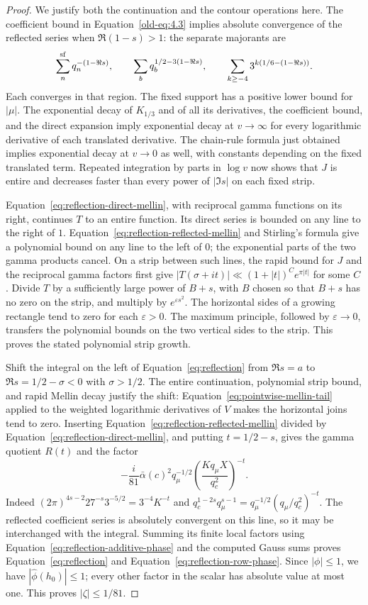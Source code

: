 \documentclass[11pt,a4paper]{article}
\numberwithin{equation}{section}
\numberwithin{figure}{section}
\theoremstyle{definition}
\theoremstyle{remark}
\begin{document}
\begin{proof}
We justify both the continuation and the contour operations here.
The coefficient bound in Equation~\eqref{old-eq:4.3} implies absolute
convergence of the reflected series when $\Re(1-s)>1$: the separate
majorants are
\[
 \sum_n^{\rm sf}q_n^{-(1-\Re s)},\qquad
 \sum_b q_b^{1/2-3(1-\Re s)},\qquad
 \sum_{k\ge-4}3^{k(1/6-(1-\Re s))}.
\]
Each converges in that region.  The fixed support has a positive lower
bound for $|\mu|$.  The exponential decay of $K_{1/3}$ and of all its
derivatives, the coefficient bound, and the direct expansion imply
exponential decay at $v\to\infty$ for every logarithmic derivative of
each translated derivative.  The chain-rule formula just obtained
implies exponential decay at $v\to0$ as well, with constants depending
on the fixed translated term.  Repeated integration by parts in
$\log v$ now shows that $J$ is entire and decreases faster than every
power of $|\Im s|$ on each fixed strip.

Equation~\eqref{eq:reflection-direct-mellin}, with reciprocal gamma
functions on its right, continues $T$ to an entire function.  Its
direct series is bounded on any line to the right of $1$.
Equation~\eqref{eq:reflection-reflected-mellin} and Stirling's formula
give a polynomial bound on any line to the left of $0$; the exponential
parts of the two gamma products cancel.  On a strip between such lines,
the rapid bound for $J$ and the reciprocal gamma factors first give
$|T(\sigma+it)|\ll (1+|t|)^C e^{\pi|t|}$ for some $C$.
Divide $T$ by a sufficiently large power of $B+s$, with $B$ chosen so
that $B+s$ has no zero on the strip, and multiply by $e^{\varepsilon s^2}$.
The horizontal sides of a growing rectangle tend to zero for each
$\varepsilon>0$.  The maximum principle, followed by
$\varepsilon\to0$, transfers the polynomial bounds on the two vertical
sides to the strip.  This proves the stated polynomial strip growth.

Shift the integral on the left of Equation~\eqref{eq:reflection} from
$\Re s=a$ to $\Re s=1/2-\sigma<0$ with $\sigma>1/2$.
The entire continuation, polynomial strip bound, and rapid Mellin decay
justify the shift: Equation~\eqref{eq:pointwise-mellin-tail} applied to the
weighted logarithmic derivatives of $V$ makes the horizontal joins tend
to zero.  Inserting
Equation~\eqref{eq:reflection-reflected-mellin} divided by
Equation~\eqref{eq:reflection-direct-mellin}, and putting $t=1/2-s$,
gives the gamma quotient $R(t)$ and the factor
\[
 -\frac i{81}\bar\alpha(c)^2q_\mu^{-1/2}
       \left(\frac{Kq_\mu X}{q_c^2}\right)^{-t}.
\]
Indeed $(2\pi)^{4s-2}27^{-s}3^{-5/2}
=3^{-4}K^{-t}$ and $q_c^{1-2s}q_\mu^{s-1}
=q_\mu^{-1/2}(q_\mu/q_c^2)^{-t}$.
The reflected coefficient series is absolutely convergent on this
line, so it may be interchanged with the integral.  Summing its finite
local factors using Equation~\eqref{eq:reflection-additive-phase}
and the computed Gauss sums proves Equation~\eqref{eq:reflection} and
Equation~\eqref{eq:reflection-row-phase}.  Since $|\phi|\le1$, we have
$|\widehat\phi(h_0)|\le1$; every other factor in the scalar has
absolute value at most one.  This proves $|\zeta|\le1/81$.


\end{proof}
\end{document}
